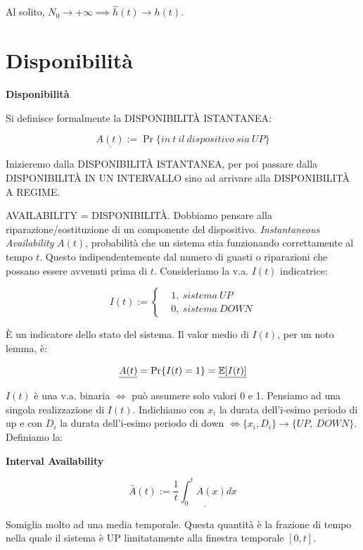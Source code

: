 Al solito, $N_0\to +\infty \implies \hat{h}(t)\to h(t)$.

\section{Disponibilità}

\begin{defn}{\textbf{Disponibilità}}

Si definisce formalmente la DISPONIBILIT\`A ISTANTANEA:

\[
	\underline{A(t)} := \Pr\{in\ t\ il\ dispositivo\ sia\ UP\}
\]

\end{defn}

Inizieremo dalla DISPONIBILIT\`A ISTANTANEA, per poi passare dalla DISPONIBILIT\`A IN UN INTERVALLO sino ad arrivare alla DISPONIBILIT\`A A REGIME.

AVAILABILITY = DISPONIBILIT\`A. Dobbiamo pensare alla riparazione/sostituzione di un componente del dispositivo. \textit{Instantaneous Availability} $A(t)$, probabilità che un sistema stia funzionando correttamente al tempo $t$. Questo indipendentemente dal numero di guasti o riparazioni che possano essere avvenuti prima di $t$. Consideriamo la v.a. $I(t)$ indicatrice:

\[
	I(t) := \left\{
	\begin{aligned}
	&1,\ sistema\ UP\\
	&0,\ sistema\ DOWN
	\end{aligned}
	\right.
\]

\`E un indicatore dello stato del sistema. Il valor medio di $I(t)$, per un noto lemma, è:

\[
	\underline{A(t)} = \Pr\{I(t) = 1\} = \underline{\operatorname{\mathbb{E}}[I(t)]}
\]

$I(t)$ è una v.a. binaria $\iff$ può assumere solo valori 0 e 1. Pensiamo ad una singola realizzazione di $I(t)$. Indichiamo con $x_i$ la durata dell'i-esimo periodo di up e con $D_i$ la durata dell'i-esimo periodo di down $\iff \{x_i,D_i\} \rightarrow \{UP,\ DOWN\}$. Definiamo la:

\begin{defn}{\textbf{Interval Availability}}

\[
	\bar{A}(t) := \underline{\frac{1}{t}\int_0^t{A(x)dx}}
\]
\end{defn}

Somiglia molto ad una media temporale. Questa quantità è la frazione di tempo nella quale il sistema è UP limitatamente alla finestra temporale $[0,t]$. 

